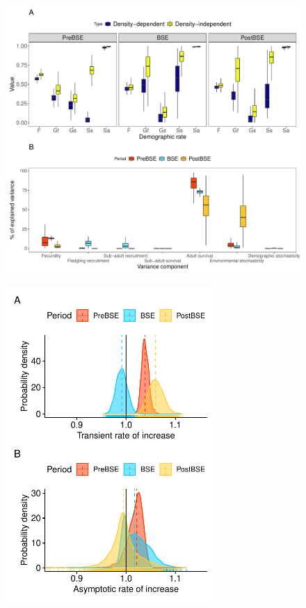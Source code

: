 \documentclass[12pt]{article}
\begin{document}
\newpage
\begin{figure}[h!]
	\caption{}
	\label{Fig2}
	\begin{center}
		\includegraphics[width=15cm]{figs/Fig2.pdf}
	\end{center}
\end{figure}

\newpage
\begin{figure}[h!]
	\caption{}
	\label{Fig3}
	\begin{center}
		\includegraphics[width=8cm]{figs/Fig3.pdf}
	\end{center}
\end{figure}
\end{document}
